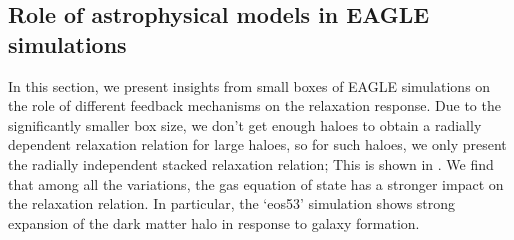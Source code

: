 \subsection{Role of astrophysical models in EAGLE simulations}
\label{sec:res-physvar-eagle}
In this section, we present insights from small boxes of EAGLE simulations on the role of different feedback mechanisms on the relaxation response.
Due to the significantly smaller box size, we don't get enough haloes to obtain a radially dependent relaxation relation for large haloes, so for such haloes, we only present the radially independent stacked relaxation relation; This is shown in . We find that among all the variations, the gas equation of state has a stronger impact on the relaxation relation. In particular, the `eos53' simulation shows strong expansion of the dark matter halo in response to galaxy formation.


